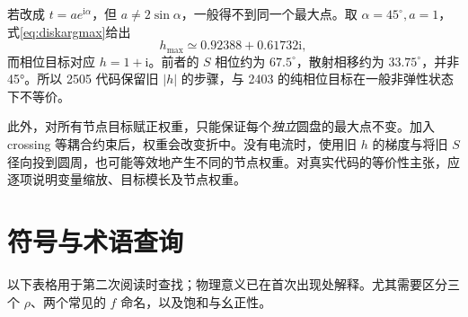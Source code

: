 \documentclass[UTF8,a4paper,11pt,fontset=fandol]{ctexart}
\numberwithin{equation}{section}
\newcommand{\ii}{\mathrm i}
\newcommand{\newchapter}[1]{\FloatBarrier\Needspace{9\baselineskip}\section{#1}}
\begin{document}
若改成 \(t=a e^{\ii\alpha}\)，但 \(a\neq2\sin\alpha\)，一般得不到同一个最大点。取 \(\alpha=45^\circ,a=1\)，式\eqref{eq:diskargmax}给出
\begin{equation}
h_{\max}\simeq0.92388+0.61732\ii,
\end{equation}
而相位目标对应 \(h=1+\ii\)。前者的 \(S\) 相位约为 \(67.5^\circ\)，散射相移约为 \(33.75^\circ\)，并非 45°。所以 2505 代码保留旧 \(|h|\) 的步骤，与 2403 的纯相位目标在一般非弹性状态下不等价。

此外，对所有节点目标赋正权重，只能保证每个\emph{独立}圆盘的最大点不变。加入 crossing 等耦合约束后，权重会改变折中。没有电流时，使用旧 \(h\) 的梯度与将旧 \(S\) 径向投到圆周，也可能等效地产生不同的节点权重。对真实代码的等价性主张，应逐项说明变量缩放、目标模长及节点权重。

\newchapter{符号与术语查询}\label{app:glossary}
以下表格用于第二次阅读时查找；物理意义已在首次出现处解释。尤其需要区分三个 \(\rho\)、两个常见的 \(f\) 命名，以及饱和与幺正性。
\end{document}
